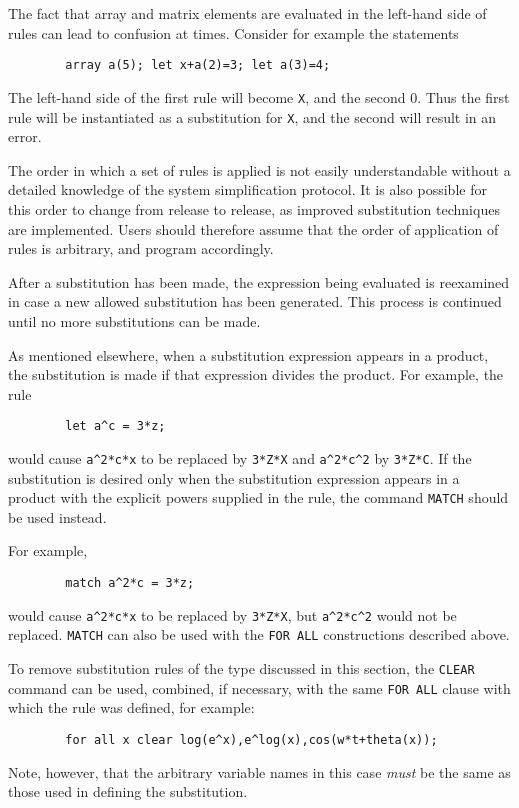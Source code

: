 The fact that array and matrix elements are evaluated in the left-hand side
of rules can lead to confusion at times. Consider for example the
statements
\begin{verbatim}
        array a(5); let x+a(2)=3; let a(3)=4;
\end{verbatim}
The left-hand side of the first rule will become {\tt X}, and the second
0.  Thus the first rule will be instantiated as a substitution for
{\tt X}, and the second will result in an error.

The order in which a set of rules is applied is not easily understandable
without a detailed knowledge of the system simplification protocol. It is
also possible for this order to change from release to release, as improved
substitution techniques are implemented. Users should therefore assume
that the order of application of rules is arbitrary, and program
accordingly.

After a substitution has been made, the expression being evaluated is
reexamined in case a new allowed substitution has been generated. This
process is continued until no more substitutions can be made.

As mentioned elsewhere, when a substitution expression appears in a
product, the substitution is made if that expression divides the product.
For example, the rule
\begin{verbatim}
        let a^c = 3*z;
\end{verbatim}
would cause {\tt a\^{ }2*c*x} to be replaced by {\tt 3*Z*X} and
{\tt a\^{ }2*c\^{ }2} by {\tt 3*Z*C}.  If the substitution is desired only
when the substitution expression appears in a product with the explicit
powers supplied in the rule, the command {\tt MATCH} should be used
instead. 

For example,
\begin{verbatim}
        match a^2*c = 3*z;
\end{verbatim}
would cause {\tt a\^{ }2*c*x} to be replaced by {\tt 3*Z*X}, but
{\tt a\^{ }2*c\^{ }2} would not be replaced. {\tt MATCH} can also be used
with the {\tt FOR ALL} constructions described above.

To remove substitution rules of the type discussed in this section, the
{\tt CLEAR}  command can be used, combined, if necessary,
with the same {\tt FOR ALL} clause with which the rule was defined, for
example:
\begin{verbatim}
        for all x clear log(e^x),e^log(x),cos(w*t+theta(x));
\end{verbatim}
Note, however, that the arbitrary variable names in this case {\em must}
be the same as those used in defining the substitution.

